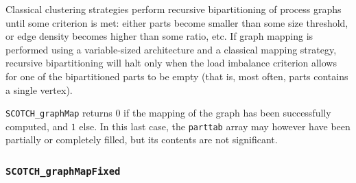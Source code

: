\begin{itemize}
Classical clustering strategies perform recursive bipartitioning of
process graphs until some criterion is met: either parts become
smaller than some size threshold, or edge density becomes higher than
some ratio, etc. If graph mapping is performed using a variable-sized
architecture and a classical mapping strategy, recursive
bipartitioning will halt only when the load imbalance criterion allows
for one of the bipartitioned parts to be empty (that is, most often,
parts contains a single vertex).

\progret

{\tt SCOTCH\_graphMap} returns $0$ if the mapping of the graph has
been successfully computed, and $1$ else. In this last case, the
{\tt parttab} array may however have been partially or completely
filled, but its contents are not significant.
\end{itemize}

\subsubsection{{\tt SCOTCH\_graphMapFixed}}
\label{sec-lib-func-graphmapfixed}

